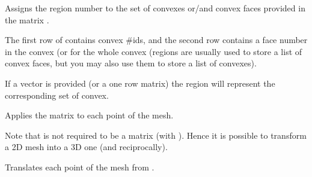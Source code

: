 \documentclass[a4paper,11pt,english]{sphinxmanual}
\begin{document}
\begin{fulllineitems}
\begin{fulllineitems}
\end{fulllineitems}


\begin{fulllineitems}
\label{\detokenize{python/cmdref_Mesh:getfem.Mesh.set_region}}
Assigns the region number  to the set of convexes or/and convex
faces provided in the matrix .

The first row of  contains convex \#ids, and the second row
contains a face number in the convex (or 
for the whole convex (regions are usually used to store a list of
convex faces, but you may also use them to store a list of convexes).

If a vector is provided (or a one row matrix) the region will represent
the corresponding set of convex.

\end{fulllineitems}


\begin{fulllineitems}
\label{\detokenize{python/cmdref_Mesh:getfem.Mesh.transform}}
Applies the matrix  to each point of the mesh.

Note that  is not required to be a  matrix (with
). Hence it is possible to transform
a 2D mesh into a 3D one (and reciprocally).

\end{fulllineitems}


\begin{fulllineitems}
\label{\detokenize{python/cmdref_Mesh:getfem.Mesh.translate}}
Translates each point of the mesh from .

\end{fulllineitems}


\end{fulllineitems}
\end{document}
